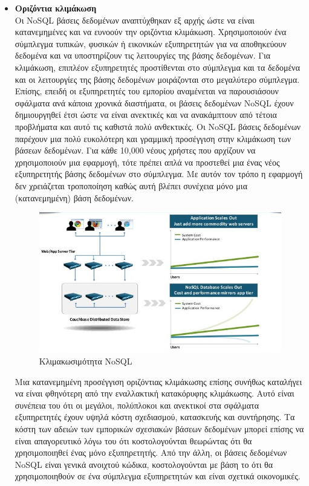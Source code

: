 \begin{itemize}
		\item {\textbf{Οριζόντια κλιμάκωση}}\\		
		Οι NoSQL βάσεις δεδομένων αναπτύχθηκαν εξ αρχής ώστε να είναι κατανεμημένες και να ευνοούν την οριζόντια κλιμάκωση. Χρησιμοποιούν ένα σύμπλεγμα τυπικών, φυσικών ή εικονικών εξυπηρετητών για να αποθηκεύουν δεδομένα και να υποστηρίζουν τις λειτουργίες της βάσης δεδομένων. Για κλιμάκωση, επιπλέον εξυπηρετητές προστίθενται στο σύμπλεγμα και τα δεδομένα και οι λειτουργίες της βάσης δεδομένων μοιράζονται στο μεγαλύτερο σύμπλεγμα. Επίσης, επειδή οι εξυπηρετητές του εμπορίου αναμένεται να παρουσιάσουν σφάλματα ανά κάποια χρονικά διαστήματα, οι βάσεις δεδομένων NoSQL έχουν δημιουργηθεί έτσι ώστε να είναι ανεκτικές και να ανακάμπτουν από τέτοια προβλήματα και αυτό τις καθιστά πολύ ανθεκτικές. Οι NoSQL βάσεις δεδομένων παρέχουν μια πολύ ευκολότερη και γραμμική προσέγγιση στην κλιμάκωση των βάσεων δεδομένων. Για κάθε 10,000 νέους χρήστες που αρχίζουν να χρησιμοποιούν μια εφαρμογή, τότε πρέπει απλά να προστεθεί μια ένας νέος εξυπηρετητής βάσης δεδομένων στο σύμπλεγμα. Με αυτόν τον τρόπο η εφαρμογή δεν χρειάζεται τροποποίηση καθώς αυτή βλέπει συνέχεια μόνο μια (κατανεμημένη) βάση δεδομένων.
		
	\begin{figure}[h]
	    \centering
	    \includegraphics[width=1\textwidth]{nosql_scales_out.jpg}
	    \caption{Κλιμακωσιμότητα NoSQL}
	    \label{fig:nosql_scales_out}
	\end{figure}
	
	Μια κατανεμημένη προσέγγιση οριζόντιας κλιμάκωσης επίσης συνήθως καταλήγει να είναι φθηνότερη από την εναλλακτική κατακόρυφης κλιμάκωσης. Αυτό είναι συνέπεια του ότι οι μεγάλοι, πολύπλοκοι και ανεκτικοί στα σφάλματα εξυπηρετητές έχουν υψηλά κόστη σχεδιασμού, κατασκευής και συντήρησης. Τα κόστη των αδειών των εμπορικών σχεσιακών βάσεων δεδομένων μπορεί επίσης να είναι απαγορευτικό λόγω του ότι κοστολογούνται θεωρώντας ότι θα χρησιμοποιηθεί ένας μόνο εξυπηρετητής. Από την άλλη, οι βάσεις δεδομένων NoSQL είναι γενικά ανοιχτού κώδικα, κοστολογούνται με βάση το ότι θα χρησιμοποιηθούν σε ένα σύμπλεγμα εξυπηρετητών και είναι σχετικά οικονομικές.		
		
		\end{itemize}
		
